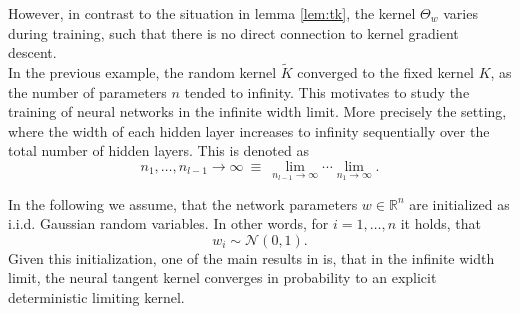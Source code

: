 \documentclass[11pt, a4paper]{article}
\newcommand{\N}{\mathbb{N}}
\newcommand{\R}{\mathbb{R}}
\newcommand*{\tr}{^{\mkern-1.5mu\mathsf{T}}}
\begin{document}
However, in contrast to the situation in lemma \ref{lem:tk}, the kernel $\Theta_w$ varies during training, such that there is no direct connection to kernel gradient descent.\\

In the previous example, the random kernel $\tilde{K}$ converged to the fixed kernel $K$, as the number of parameters $n$ tended to infinity. This motivates to study the training of neural networks in the infinite width limit. More precisely the setting, where the width of each hidden layer increases to infinity sequentially over the total number of hidden layers. This is denoted as
\[ n_1, \dots, n_{l-1} \to \infty \ \equiv \ \lim_{n_{l-1} \to \infty} \cdots \lim_{n_1 \to \infty}. \]


In the following we assume, that the network parameters $w \in \R^n$ are initialized as i.i.d. Gaussian random variables. In other words, for $i=1, \dots, n$ it holds, that
\[ w_i \sim \mathcal{N}(0,1). \] 
Given this initialization, one of the main results in \cite{NTK} is, that in the infinite width limit, the neural tangent kernel converges in probability to an explicit deterministic limiting kernel.
\end{document}
